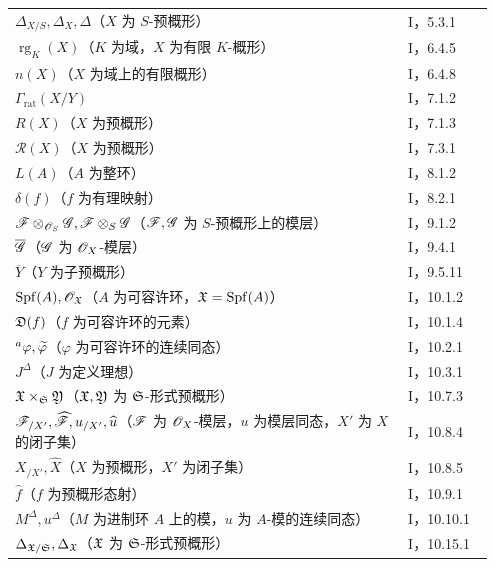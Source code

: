 \begin{longtable}{@{}p{0.78\linewidth}p{0.17\linewidth}@{}}
$\Delta_{X/S},\Delta_X,\Delta$（$X$ 为 $S$-预概形）&I，5.3.1\\
$\operatorname{rg}_K(X)$（$K$ 为域，$X$ 为有限 $K$-概形）&I，6.4.5\\
$n(X)$（$X$ 为域上的有限概形）&I，6.4.8\\
$\Gamma_{\mathrm{rat}}(X/Y)$&I，7.1.2\\
$R(X)$（$X$ 为预概形）&I，7.1.3\\
$\mathscr R(X)$（$X$ 为预概形）&I，7.3.1\\
$L(A)$（$A$ 为整环）&I，8.1.2\\
$\delta(f)$（$f$ 为有理映射）&I，8.2.1\\
$\mathscr F\otimes_{\mathscr O_S}\mathscr G,\mathscr F\otimes_S\mathscr G$（$\mathscr F,\mathscr G$ 为 $S$-预概形上的模层）&I，9.1.2\\
$\overline{\mathscr G}$（$\mathscr G$ 为 $\mathscr O_X$-模层）&I，9.4.1\\
$\overline Y$（$Y$ 为子预概形）&I，9.5.11\\
$\operatorname{Spf}(A),\mathscr O_{\mathfrak X}$（$A$ 为可容许环，$\mathfrak X=\operatorname{Spf}(A)$）&I，10.1.2\\
$\mathfrak D(f)$（$f$ 为可容许环的元素）&I，10.1.4\\
${}^{a}\varphi,\widetilde{\varphi}$（$\varphi$ 为可容许环的连续同态）&I，10.2.1\\
$J^\Delta$（$J$ 为定义理想）&I，10.3.1\\
$\mathfrak X\times_{\mathfrak S}\mathfrak Y$（$\mathfrak X,\mathfrak Y$ 为 $\mathfrak S$-形式预概形）&I，10.7.3\\
$\mathscr F_{/X'},\widehat{\mathscr F},u_{/X'},\widehat u$（$\mathscr F$ 为 $\mathscr O_X$-模层，$u$ 为模层同态，$X'$ 为 $X$ 的闭子集）&I，10.8.4\\
$X_{/X'},\widehat X$（$X$ 为预概形，$X'$ 为闭子集）&I，10.8.5\\
$\widehat f$（$f$ 为预概形态射）&I，10.9.1\\
$M^\Delta,u^\Delta$（$M$ 为进制环 $A$ 上的模，$u$ 为 $A$-模的连续同态）&I，10.10.1\\
$\Delta_{\mathfrak X/\mathfrak S},\Delta_{\mathfrak X}$（$\mathfrak X$ 为 $\mathfrak S$-形式预概形）&I，10.15.1\\
\end{longtable}
\endgroup



\par

